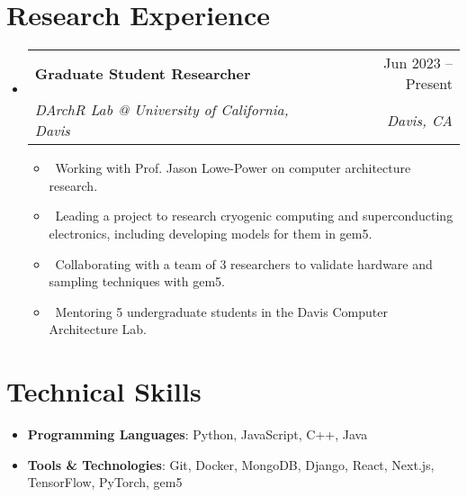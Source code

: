\documentclass[letterpaper,10pt]{article}
\makeatletter
\newcommand{\resumeItem}[1]{\item\small{#1}}
\newcommand{\resumeSubheading}[4]{
\vspace{-1pt}\item
  \begin{tabular*}{0.97\textwidth}[t]{l@{\extracolsep{\fill}}r}
    \textbf{#1} & #2 \\
    \textit{#3} & \textit{#4} \\
  \end{tabular*}\vspace{-7pt}
}
\newcommand{\resumeSubHeadingList}{\begin{itemize}[leftmargin=0.15in, label={}]}
\newcommand{\resumeSubHeadingListEnd}{\end{itemize}}
\makeatother
\begin{document}
\section{Research Experience}
\resumeSubHeadingList
  \resumeSubheading
      {Graduate Student Researcher}{Jun 2023 -- Present}
      {DArchR Lab @ University of California, Davis}{Davis, CA}
      \resumeSubHeadingList
          \resumeItem{\textbullet\ Working with Prof. Jason Lowe-Power on computer architecture research.}
          \resumeItem{\textbullet\ Leading a project to research cryogenic computing and superconducting electronics, including developing models for them in gem5.}
          \resumeItem{\textbullet\ Collaborating with a team of 3 researchers to validate hardware and sampling techniques with gem5.}
          \resumeItem{\textbullet\ Mentoring 5 undergraduate students in the Davis Computer Architecture Lab.}
      \resumeSubHeadingListEnd
\resumeSubHeadingListEnd



\section{Technical Skills}
\resumeSubHeadingList
  \resumeItem{\textbf{Programming Languages}: Python, JavaScript, C++, Java}
    \resumeItem{\textbf{Tools \& Technologies}: Git, Docker, MongoDB, Django, React, Next.js, TensorFlow, PyTorch, gem5}
\resumeSubHeadingListEnd
\end{document}
